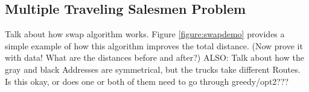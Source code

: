 \documentclass[letterpaper]{article}
\begin{document}
\begin{figure}[h]
\begin{minipage}{0.3\linewidth}
        \end{minipage}
    \end{figure}

    \subsection{Multiple Traveling Salesmen Problem}
    \label{subsection:Multiple_Traveling_Salesmen_Problem}
    Talk about how swap algorithm works. Figure \ref{figure:swapdemo} provides a simple example of how this algorithm improves the total distance. (Now prove it with data! What are the distances before and after?) ALSO: Talk about how the gray and black Addresses are symmetrical, but the trucks take different Routes. Is this okay, or does one or both of them need to go through greedy/opt2???
\end{document}
